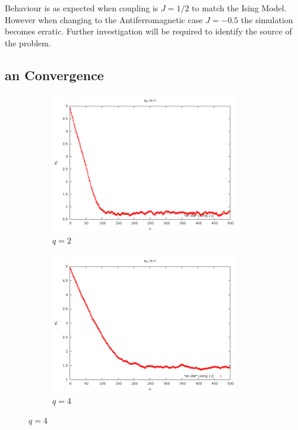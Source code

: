 \documentclass[12pt,a4paper,notitlepage,twoside]{article}
\begin{document}
Behaviour is as expected when coupling is $J = 1/2$ to match the Ising Model. However when changing to the Antiferromagnetic case $J=-0.5$ the simulation becomes erratic.
Further investigation will be required to identify the source of the problem.

\subsection{an Convergence}

\begin{figure}[H]
\centering
\begin{subfigure}[b]{0.45\textwidth}
	\includegraphics[width=0.9\textwidth]{q2d20/anconvergence.png}
	\caption{$q=2$}
\end{subfigure}
\begin{subfigure}[b]{0.45\textwidth}
	\includegraphics[width=0.9\textwidth]{q4d20/anconvergence.png}
	\caption{$q=4$}
\end{subfigure}


\end{figure}
\end{document}
